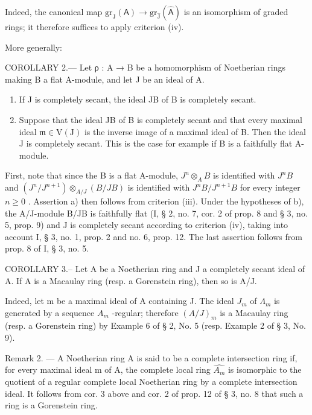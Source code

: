 Indeed, the canonical map \(\mathrm{gr}_{\mathrm{J}}(\mathsf{A}) \to \mathrm{gr}_{\widehat{\mathrm{J}}}(\widehat{\mathsf{A}})\) is an isomorphism of graded rings; it therefore suffices to apply criterion (iv).

More generally:

COROLLARY 2.--- Let ρ : A → B be a homomorphism of Noetherian rings making B a flat A-module, and let J be an ideal of A.

\begin{enumerate}
\def\labelenumi{\alph{enumi})}
\item
  If J is completely secant, the ideal JB of B is completely secant.
\item
  Suppose that the ideal JB of B is completely secant and that every maximal ideal \(\mathfrak{m} \in \mathrm{V}(\mathrm{J})\) is the inverse image of a maximal ideal of B. Then the ideal J is completely secant. This is the case for example if B is a faithfully flat A-module.
\end{enumerate}

First, note that since the B is a flat A-module, \(J^n \otimes_A B\) is identified with \(J^n B\) and \((J^n / J^{n+1}) \otimes_{A/J} (B/JB)\) is identified with \(J^n B / J^{n+1} B\) for every integer \(n \geqslant 0\) . Assertion a) then follows from criterion (iii). Under the hypotheses of b), the A/J-module B/JB is faithfully flat (I, § 2, no. 7, cor. 2 of prop. 8 and § 3, no. 5, prop. 9) and J is completely secant according to criterion (iv), taking into account I, § 3, no. 1, prop. 2 and no. 6, prop. 12. The last assertion follows from prop. 8 of I, § 3, no. 5.

COROLLARY 3.-- Let A be a Noetherian ring and J a completely secant ideal of A. If A is a Macaulay ring (resp. a Gorenstein ring), then so is A/J.

Indeed, let m be a maximal ideal of A containing J. The ideal \(J_{m}\) of \(\Lambda_{m}\) is generated by a sequence \(A_{m}\) -regular; therefore \((A/J)_{m}\) is a Macaulay ring (resp. a Gorenstein ring) by Example 6 of § 2, No. 5 (resp. Example 2 of § 3, No. 9).

Remark 2. — A Noetherian ring A is said to be a complete intersection ring if, for every maximal ideal m of A, the complete local ring \(\widehat{A_{m}}\) is isomorphic to the quotient of a regular complete local Noetherian ring by a complete intersection ideal. It follows from cor. 3 above and cor. 2 of prop. 12 of § 3, no. 8 that such a ring is a Gorenstein ring.

